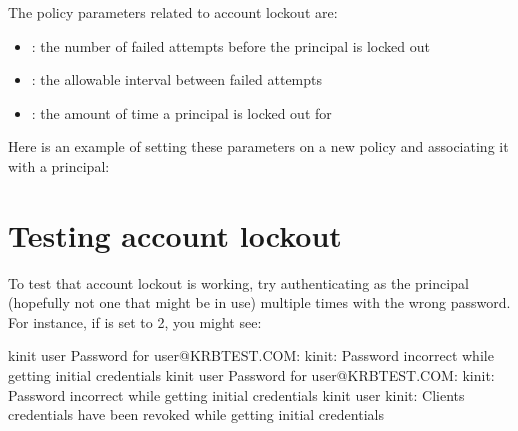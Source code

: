 \documentclass[letterpaper,10pt,english]{sphinxmanual}
\begin{document}
The policy parameters related to account lockout are:
\begin{itemize}
\item {} 
{\hyperref[\detokenize{admin/database:policy-maxfailure}]{}}: the number of failed attempts
before the principal is locked out

\item {} 
{\hyperref[\detokenize{admin/database:policy-failurecountinterval}]{}}: the
allowable interval between failed attempts

\item {} 
{\hyperref[\detokenize{admin/database:policy-lockoutduration}]{}}: the amount of time
a principal is locked out for

\end{itemize}

Here is an example of setting these parameters on a new policy and
associating it with a principal:

%
\begin{sphinxVerbatim}[commandchars=\\\{\}]
     
      
    
\end{sphinxVerbatim}


\section{Testing account lockout}
\label{\detokenize{admin/lockout:testing-account-lockout}}
To test that account lockout is working, try authenticating as the
principal (hopefully not one that might be in use) multiple times with
the wrong password.  For instance, if  is set to 2, you
might see:

%
\begin{sphinxVerbatim}[commandchars=\\\{\}]
\PYGZdl{} kinit user
Password for user@KRBTEST.COM:
kinit: Password incorrect while getting initial credentials
\PYGZdl{} kinit user
Password for user@KRBTEST.COM:
kinit: Password incorrect while getting initial credentials
\PYGZdl{} kinit user
kinit: Client\PYGZsq{}s credentials have been revoked while getting initial credentials
\end{sphinxVerbatim}
\end{document}
